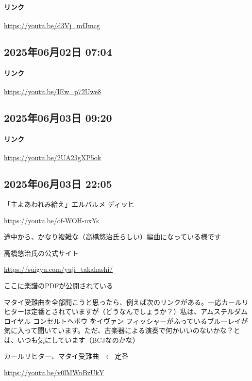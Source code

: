 \paragraph{リンク}
\url{https://youtu.be/d3Vj_mfJmcg}

\subsection*{2025年06月02日 07:04}

\paragraph{リンク}
\url{https://youtu.be/IEw_p72Uwe8}

\subsection*{2025年06月03日 09:20}

\paragraph{リンク}
\url{https://youtu.be/2UA23gXP5ok}

\subsection*{2025年06月03日 22:05}

「主よあわれみ給え」エルバルメ ディッヒ

\url{https://youtu.be/of-WOH-uxYs}

途中から、かなり複雑な（高橋悠治氏らしい）編曲になっている様です

高橋悠治氏の公式サイト

\url{https://suigyu.com/yuji_takahashi/}

ここに楽譜のPDFが公開されている

マタイ受難曲を全部聞こうと思ったら、例えば次のリンクがある。一応カールリヒターは定番とされていますが（どうなんでしょうか？）私は、アムステルダム  ロイヤル コンセルトヘボウ をイヴァン フィッシャーがふっているブルーレイが気に入って聞いています。ただ、古楽器による演奏で何かいいのないかな？とは、いつも気にしています（BCJなのかな）

カールリヒター、マタイ受難曲　← 定番

\url{https://youtu.be/v0lMWnBzUkY}


